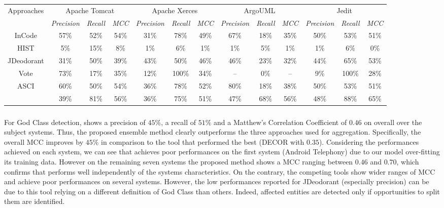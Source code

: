 \begin{table*}
\begin{adjustbox}{width=\textwidth}
\begin{tabular}{|c|c|c|c|c|c|c|c|c|c|c|c|c|}
\hline
\multirow{2}{*}{Approaches}& 
\multicolumn{3}{c|}{
	Apache Tomcat
} 
&\multicolumn{3}{c|}{
	Apache Xerces
}
&\multicolumn{3}{c|}{
	ArgoUML
}
&\multicolumn{3}{c|}{
	Jedit 
}\bigstrut [t] \\ 
\cline{2-13}
&\textit{Precision}&\textit{Recall}&\textit{  MCC  }
&\textit{Precision}&\textit{Recall}&\textit{  MCC  }
&\textit{Precision}&\textit{Recall}&\textit{  MCC  }
&\textit{Precision}&\textit{Recall}&\textit{  MCC  } \bigstrut [t]\\
\hline
InCode &57\%&52\%&54\%&31\%&78\%&49\%&67\%&18\%&35\%&50\%&53\%&51\% \bigstrut \\ \hline
HIST &5\%&15\%&8\%&1\%&6\%&1\%&1\%&5\%&1\%&1\%&6\%&0\% \bigstrut \\ \hline
JDeodorant &31\%&50\%&39\%&43\%&50\%&46\%&46\%&23\%&32\%&44\%&65\%&53\% \bigstrut \\ \hline
Vote &73\%&17\%&35\%&12\%&100\%&34\%&--&0\%&--&9\%&100\%&28\% \bigstrut \\ \hline
ASCI &60\%&50\%&54\%&36\%&78\%&52\%&80\%&18\%&38\%&50\%&53\%&51\% \bigstrut \\ \hline
\textbf{\NAME{}} &39\%&81\%&56\%&36\%&75\%&51\%&47\%&68\%&56\%&48\%&88\%&65\% \bigstrut \\ \hline
\end{tabular}
\end{adjustbox}
\end{table*}

\subsubsection{\RQone{}}
For God Class detection, \NAME{} shows a precision of $45\%$, a recall of $51\%$ and a Matthew's Correlation Coefficient of $0.46$ on overall over the subject systems. Thus, the proposed ensemble method clearly outperforms the three approaches used for aggregation. Specifically, the overall MCC improves by $45\%$ in comparison to the tool that performed the best (DECOR with $0.35$). Considering the performances achieved on each system, we can see that \NAME{} achieves poor performances on the first system (Android Telephony) due to our model over-fitting its training data. However on the remaining seven systems the proposed method shows a MCC ranging between $0.46$ and $0.70$, which confirms that \NAME{} performs well independently of the systems characteristics. On the contrary, the competing tools show wider ranges of MCC and achieve poor performances on several systems. However, the low performances reported for JDeodorant (especially precision) can be due to this tool relying on a different definition of God Class than others. Indeed, affected entities are detected only if opportunities to split them are identified.

